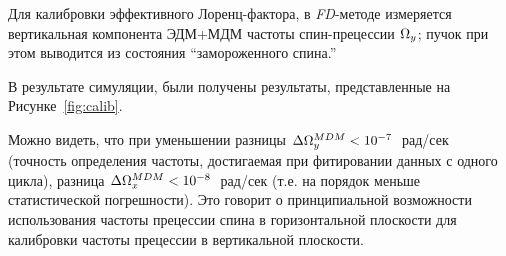 Для калибровки эффективного Лоренц-фактора, в \emph{FD}-методе измеряется вертикальная компонента
ЭДМ+МДМ частоты спин-прецессии $\Omega_y$; пучок при этом выводится из состояния ``замороженного спина.'' 

В результате симуляции, были получены результаты, представленные на Рисунке~\ref{fig:calib}.

Можно видеть, что при уменьшении разницы ${\Delta\Omega_y^{MDM} < 10^{-7}}$~рад/сек 
(точность определения частоты, достигаемая при фитировании данных с одного цикла), 
разница ${\Delta \Omega_x^{MDM} < 10^{-8}}$~рад/сек (т.е. на порядок меньше статистической погрешности). 
Это говорит о принципиальной возможности использования частоты прецессии спина в горизонтальной плоскости 
для калибровки частоты прецессии в вертикальной плоскости.

\begin{figure}[H]\centering
\end{figure}
